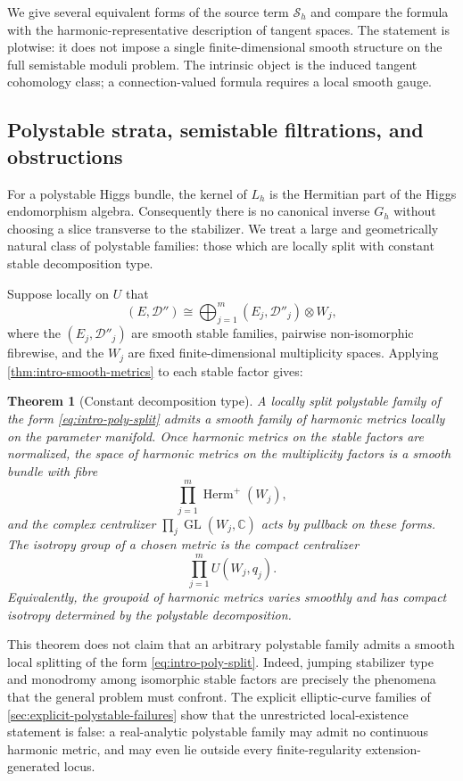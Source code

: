 \documentclass[11pt,reqno]{amsart}
\newtheorem{theorem}{Theorem}[section]
\theoremstyle{definition}
\theoremstyle{remark}
\newcommand{\C}{\mathbb C}
\newcommand{\cD}{\mathcal D}
\newcommand{\cS}{\mathcal S}
\begin{document}
We give several equivalent forms of the source term $\cS_h$ and compare the formula with the harmonic-representative description of tangent spaces.  The statement is plotwise: it does not impose a single finite-dimensional smooth structure on the full semistable moduli problem.  The intrinsic object is the induced tangent cohomology class; a connection-valued formula requires a local smooth gauge.

\subsection{Polystable strata, semistable filtrations, and obstructions}

For a polystable Higgs bundle, the kernel of $L_h$ is the Hermitian part of the Higgs endomorphism algebra.  Consequently there is no canonical inverse $G_h$ without choosing a slice transverse to the stabilizer.  We treat a large and geometrically natural class of polystable families: those which are locally split with constant stable decomposition type.

Suppose locally on $U$ that
\begin{equation}\label{eq:intro-poly-split}
  (E,\cD'')\cong\bigoplus_{j=1}^m (E_j,\cD''_j)\otimes W_j,
\end{equation}
where the $(E_j,\cD''_j)$ are smooth stable families, pairwise non-isomorphic fibrewise, and the $W_j$ are fixed finite-dimensional multiplicity spaces.  Applying \cref{thm:intro-smooth-metrics} to each stable factor gives:

\begin{theorem}[Constant decomposition type]\label{thm:intro-poly}
A locally split polystable family of the form \eqref{eq:intro-poly-split} admits a smooth family of harmonic metrics locally on the parameter manifold.  Once harmonic metrics on the stable factors are normalized, the space of harmonic metrics on the multiplicity factors is a smooth bundle with fibre
\[
  \prod_{j=1}^m \operatorname{Herm}^+(W_j),
\]
and the complex centralizer $\prod_j\operatorname{GL}(W_j,\C)$ acts by pullback on these forms.  The isotropy group of a chosen metric is the compact centralizer
\[
  \prod_{j=1}^m U(W_j,q_j).
\]
Equivalently, the groupoid of harmonic metrics varies smoothly and has compact isotropy determined by the polystable decomposition.
\end{theorem}

This theorem does not claim that an arbitrary polystable family admits a smooth local splitting of the form \eqref{eq:intro-poly-split}.  Indeed, jumping stabilizer type and monodromy among isomorphic stable factors are precisely the phenomena that the general problem must confront.  The explicit elliptic-curve families of \cref{sec:explicit-polystable-failures} show that the unrestricted local-existence statement is false: a real-analytic polystable family may admit no continuous harmonic metric, and may even lie outside every finite-regularity extension-generated locus.
\end{document}
